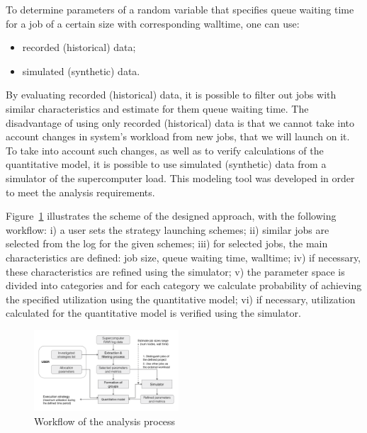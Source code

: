 To determine parameters of a random variable that specifies queue waiting
time for a job of a certain size with corresponding walltime, one can use:
\begin{itemize}
    \item recorded (historical) data;
    \item simulated (synthetic) data.
\end{itemize}

By evaluating recorded (historical) data, it is possible to filter out jobs
with similar characteristics and estimate for them queue waiting time. The
disadvantage of using only recorded (historical) data is that we cannot take
into account changes in system's workload from new jobs, that we will launch
on it. To take into account such changes, as well as to verify calculations
of the quantitative model, it is possible to use simulated (synthetic) data
from a simulator of the supercomputer load. This modeling tool was developed in
order to meet the analysis requirements.

Figure~\ref{fig-analysis-workflow} illustrates the scheme of the designed
approach, with the following workflow: i) a user sets the strategy launching
schemes; ii) similar jobs are selected from the log for the given schemes;
iii) for selected jobs, the main characteristics are defined: job size, queue
waiting time, walltime; iv) if necessary, these characteristics are refined
using the simulator; v) the parameter space is divided into categories and for
each category we calculate probability of achieving the specified utilization
using the quantitative model; vi) if necessary, utilization calculated for the
quantitative model is verified using the simulator.

\begin{figure}
    \centering
    \includegraphics[width=0.48\textwidth]{pics/analysis-workflow.png}
    \caption{Workflow of the analysis process}
    \label{fig-analysis-workflow} 
\end{figure}
